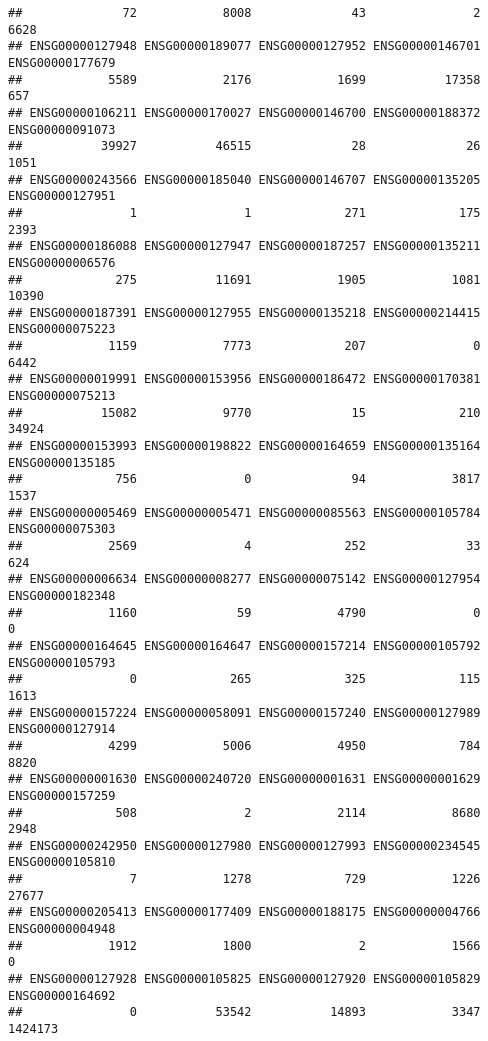 \documentclass[
]{article}
\begin{document}
\begin{verbatim}
##              72            8008              43               2            6628 
## ENSG00000127948 ENSG00000189077 ENSG00000127952 ENSG00000146701 ENSG00000177679 
##            5589            2176            1699           17358             657 
## ENSG00000106211 ENSG00000170027 ENSG00000146700 ENSG00000188372 ENSG00000091073 
##           39927           46515              28              26            1051 
## ENSG00000243566 ENSG00000185040 ENSG00000146707 ENSG00000135205 ENSG00000127951 
##               1               1             271             175            2393 
## ENSG00000186088 ENSG00000127947 ENSG00000187257 ENSG00000135211 ENSG00000006576 
##             275           11691            1905            1081           10390 
## ENSG00000187391 ENSG00000127955 ENSG00000135218 ENSG00000214415 ENSG00000075223 
##            1159            7773             207               0            6442 
## ENSG00000019991 ENSG00000153956 ENSG00000186472 ENSG00000170381 ENSG00000075213 
##           15082            9770              15             210           34924 
## ENSG00000153993 ENSG00000198822 ENSG00000164659 ENSG00000135164 ENSG00000135185 
##             756               0              94            3817            1537 
## ENSG00000005469 ENSG00000005471 ENSG00000085563 ENSG00000105784 ENSG00000075303 
##            2569               4             252              33             624 
## ENSG00000006634 ENSG00000008277 ENSG00000075142 ENSG00000127954 ENSG00000182348 
##            1160              59            4790               0               0 
## ENSG00000164645 ENSG00000164647 ENSG00000157214 ENSG00000105792 ENSG00000105793 
##               0             265             325             115            1613 
## ENSG00000157224 ENSG00000058091 ENSG00000157240 ENSG00000127989 ENSG00000127914 
##            4299            5006            4950             784            8820 
## ENSG00000001630 ENSG00000240720 ENSG00000001631 ENSG00000001629 ENSG00000157259 
##             508               2            2114            8680            2948 
## ENSG00000242950 ENSG00000127980 ENSG00000127993 ENSG00000234545 ENSG00000105810 
##               7            1278             729            1226           27677 
## ENSG00000205413 ENSG00000177409 ENSG00000188175 ENSG00000004766 ENSG00000004948 
##            1912            1800               2            1566               0 
## ENSG00000127928 ENSG00000105825 ENSG00000127920 ENSG00000105829 ENSG00000164692 
##               0           53542           14893            3347         1424173 

\end{verbatim}
\end{document}
